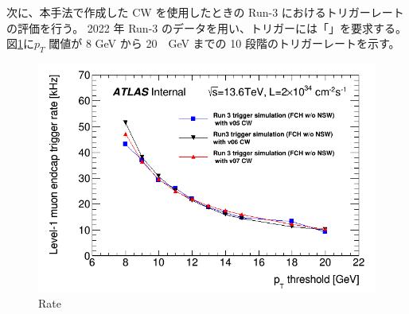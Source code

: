 次に、本手法で作成した CW を使用したときの Run-3 におけるトリガーレートの評価を行う。
2022 年 Run-3 のデータを用い、トリガーには「」を要求する。
図\ref{fig:Run-3_rate}に$p_T$ 閾値が 8 GeV から 20　GeV までの 10 段階のトリガーレートを示す。
\begin{figure}[tb]
  \centering
  \includegraphics[clip, width=14cm]{fig/5/l1mue_rate_run3.png}
  \caption{Rate}
  \label{fig:Run-3_rate}
\end{figure}









